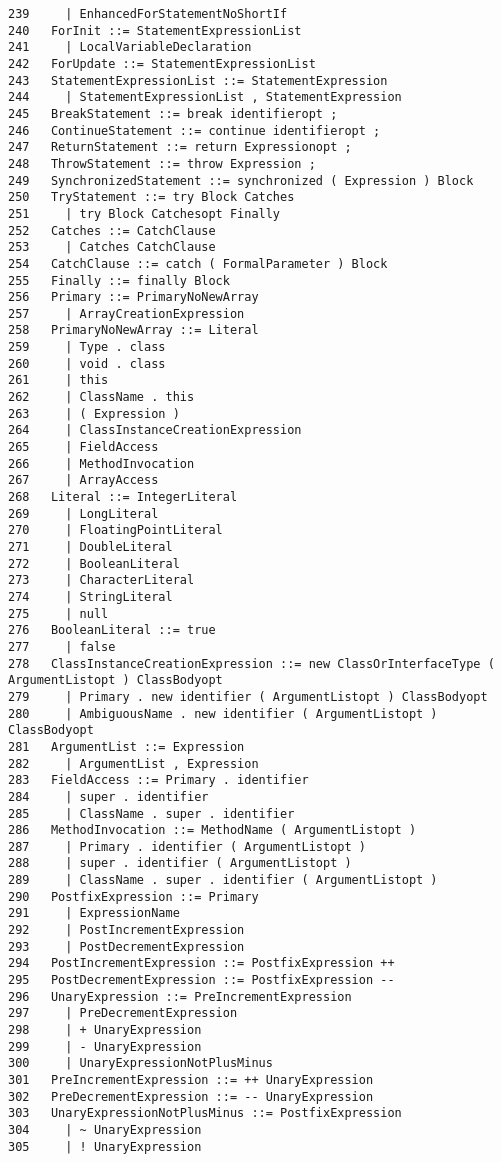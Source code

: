 {\begin{verbatim}
239     | EnhancedForStatementNoShortIf
240   ForInit ::= StatementExpressionList
241     | LocalVariableDeclaration
242   ForUpdate ::= StatementExpressionList
243   StatementExpressionList ::= StatementExpression
244     | StatementExpressionList , StatementExpression
245   BreakStatement ::= break identifieropt ;
246   ContinueStatement ::= continue identifieropt ;
247   ReturnStatement ::= return Expressionopt ;
248   ThrowStatement ::= throw Expression ;
249   SynchronizedStatement ::= synchronized ( Expression ) Block
250   TryStatement ::= try Block Catches
251     | try Block Catchesopt Finally
252   Catches ::= CatchClause
253     | Catches CatchClause
254   CatchClause ::= catch ( FormalParameter ) Block
255   Finally ::= finally Block
256   Primary ::= PrimaryNoNewArray
257     | ArrayCreationExpression
258   PrimaryNoNewArray ::= Literal
259     | Type . class
260     | void . class
261     | this
262     | ClassName . this
263     | ( Expression )
264     | ClassInstanceCreationExpression
265     | FieldAccess
266     | MethodInvocation
267     | ArrayAccess
268   Literal ::= IntegerLiteral
269     | LongLiteral
270     | FloatingPointLiteral
271     | DoubleLiteral
272     | BooleanLiteral
273     | CharacterLiteral
274     | StringLiteral
275     | null
276   BooleanLiteral ::= true
277     | false
278   ClassInstanceCreationExpression ::= new ClassOrInterfaceType ( ArgumentListopt ) ClassBodyopt
279     | Primary . new identifier ( ArgumentListopt ) ClassBodyopt
280     | AmbiguousName . new identifier ( ArgumentListopt ) ClassBodyopt
281   ArgumentList ::= Expression
282     | ArgumentList , Expression
283   FieldAccess ::= Primary . identifier
284     | super . identifier
285     | ClassName . super . identifier
286   MethodInvocation ::= MethodName ( ArgumentListopt )
287     | Primary . identifier ( ArgumentListopt )
288     | super . identifier ( ArgumentListopt )
289     | ClassName . super . identifier ( ArgumentListopt )
290   PostfixExpression ::= Primary
291     | ExpressionName
292     | PostIncrementExpression
293     | PostDecrementExpression
294   PostIncrementExpression ::= PostfixExpression ++
295   PostDecrementExpression ::= PostfixExpression --
296   UnaryExpression ::= PreIncrementExpression
297     | PreDecrementExpression
298     | + UnaryExpression
299     | - UnaryExpression
300     | UnaryExpressionNotPlusMinus
301   PreIncrementExpression ::= ++ UnaryExpression
302   PreDecrementExpression ::= -- UnaryExpression
303   UnaryExpressionNotPlusMinus ::= PostfixExpression
304     | ~ UnaryExpression
305     | ! UnaryExpression

\end{verbatim}}
